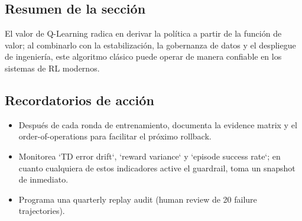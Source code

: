 \subsection{Resumen de la sección}

El valor de Q-Learning radica en derivar la política a partir de la función de valor; al combinarlo con la estabilización, la gobernanza de datos y el despliegue de ingeniería, este algoritmo clásico puede operar de manera confiable en los sistemas de RL modernos.

\subsection{Recordatorios de acción}

\begin{itemize}
    \item Después de cada ronda de entrenamiento, documenta la evidence matrix y el order-of-operations para facilitar el próximo rollback.
    \item Monitorea `TD error drift`, `reward variance` y `episode success rate`; en cuanto cualquiera de estos indicadores active el guardrail, toma un snapshot de inmediato.
    \item Programa una quarterly replay audit (human review de 20 failure trajectories).
\end{itemize}


